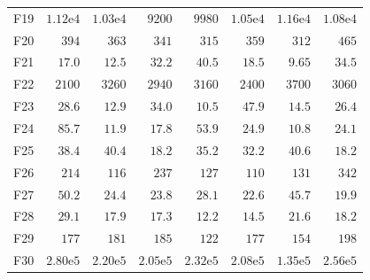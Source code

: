 \begin{tabular}{lrrrrrrr}
F19 & $1.12\mathrm{e}{4}$ & $1.03\mathrm{e}{4}$ & $9200$ & $9980$ & $1.05\mathrm{e}{4}$ & $1.16\mathrm{e}{4}$ & $1.08\mathrm{e}{4}$ \\
F20 & $394$ & $363$ & $341$ & $315$ & $359$ & $312$ & $465$ \\
F21 & $17.0$ & $12.5$ & $32.2$ & $40.5$ & $18.5$ & $9.65$ & $34.5$ \\
F22 & $2100$ & $3260$ & $2940$ & $3160$ & $2400$ & $3700$ & $3060$ \\
F23 & $28.6$ & $12.9$ & $34.0$ & $10.5$ & $47.9$ & $14.5$ & $26.4$ \\
F24 & $85.7$ & $11.9$ & $17.8$ & $53.9$ & $24.9$ & $10.8$ & $24.1$ \\
F25 & $38.4$ & $40.4$ & $18.2$ & $35.2$ & $32.2$ & $40.6$ & $18.2$ \\
F26 & $214$ & $116$ & $237$ & $127$ & $110$ & $131$ & $342$ \\
F27 & $50.2$ & $24.4$ & $23.8$ & $28.1$ & $22.6$ & $45.7$ & $19.9$ \\
F28 & $29.1$ & $17.9$ & $17.3$ & $\mathbf{12.2}$ & $14.5$ & $21.6$ & $18.2$ \\
F29 & $177$ & $181$ & $185$ & $122$ & $177$ & $154$ & $198$ \\
F30 & $2.80\mathrm{e}{5}$ & $2.20\mathrm{e}{5}$ & $2.05\mathrm{e}{5}$ & $2.32\mathrm{e}{5}$ & $2.08\mathrm{e}{5}$ & $1.35\mathrm{e}{5}$ & $2.56\mathrm{e}{5}$ \\
\bottomrule
\end{tabular}

